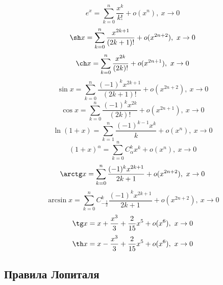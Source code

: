 \documentclass[12pt, a4paper, reqno]{article}
\begin{document}
    \begin{equation*}
        e^x = \sum\limits_{k = 0}^{n} \dfrac{x^k}{k!} + o(x^n),\ x\to 0
    \end{equation*}
    \begin{equation*}
        \sh x = \sum\limits_{k = 0}^{n} \dfrac{x^{2k + 1}}{(2k + 1)!} + o(x^{2n + 2}),\ x\to 0
    \end{equation*}
    \begin{equation*}
        \ch x = \sum\limits_{k = 0}^{n} \dfrac{x^{2k}}{(2k)!} + o(x^{2n + 1}),\ x\to 0
    \end{equation*}
    \begin{equation*}
        \sin x = \sum\limits_{k = 0}^{n} \dfrac{(-1)^kx^{2k + 1}}{(2k + 1)!} + o(x^{2n + 2}),\ x\to 0
    \end{equation*}
    \begin{equation*}
        \cos x = \sum\limits_{k = 0}^{n} \dfrac{(-1)^kx^{2k}}{(2k)!} + o(x^{2n + 1}),\ x\to 0
    \end{equation*}
    \begin{equation*}
        \ln (1 + x) = \sum\limits_{k = 1}^{n} \dfrac{(-1)^{k - 1}x^k}{k} + o(x^n),\ x\to 0
    \end{equation*}
    \begin{equation*}
        (1 + x)^{\alpha} = \sum\limits_{k = 0}^{n} C_{\alpha}^{k}x^k + o(x^n),\ x\to 0
    \end{equation*}
    \begin{equation*}
        \arctg x = \sum\limits_{k = 0}^{n} \dfrac{(-1)^kx^{2k + 1}}{2k + 1} + o(x^{2n + 2}),\ x\to 0
    \end{equation*}
    \begin{equation*}
        \arcsin x =\sum\limits_{k = 0}^{n} C_{-\frac{1}{2}}^{k}\dfrac{(-1)^kx^{2k + 1}}{2k + 1} +
        o(x^{2n + 2}),\ x\to 0
    \end{equation*}
    \begin{equation*}
        \tg x = x + \dfrac{x^3}{3} + \dfrac{2}{15}x^5 + o(x^6),\ x\to 0
    \end{equation*}
    \begin{equation*}
        \th x = x - \dfrac{x^3}{3} + \dfrac{2}{15}x^5 + o(x^6),\ x\to 0
    \end{equation*}

\subsection{Правила Лопиталя}
\end{document}
